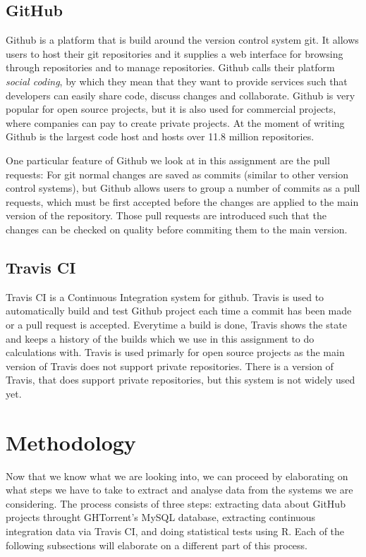 \documentclass[a4paper,11pt]{article}
\begin{document}
		\subsection{GitHub}
			Github \cite{github} is a platform that is build around the version control system git.
			It allows users to host their git repositories and it supplies a web interface for browsing through repositories and
			to manage repositories.
			Github calls their platform \emph{social coding}, by which they mean that they want to provide services such that
			developers can easily share code, discuss changes and collaborate.
			Github is very popular for open source projects, but it is also used for commercial projects, where companies can pay
			to create private projects.
			At the moment of writing Github is the largest code host and hosts over 11.8 million repositories.
			
			One particular feature of Github we look at in this assignment are the pull requests: 
			For git normal changes are saved as commits (similar to other version control systems),
			but Github allows users to group a number of commits as a pull requests, which must be first accepted before the
			changes are applied to the main version of the repository.
			Those pull requests are introduced such that the changes can be checked on quality before commiting them to the main
			version.
		
		\subsection{Travis CI}
		  Travis CI \cite{travis} is a Continuous Integration system for github.
		  Travis is used to automatically build and test Github project each time a commit has been made or a pull request
		  is accepted.
		  Everytime a build is done, Travis shows the state and keeps a history of the builds which we use in this assignment
		  to do calculations with.
		  Travis is used primarly for open source projects as the main version of Travis does not support private
		  repositories.
		  There is a version of Travis, that does support private repositories, but this system is not widely used yet.
		  
		  
		
	\section{Methodology}
		Now that we know what we are looking into, we can proceed by elaborating on what steps we have to take to extract and analyse data from the systems we are considering. The process consists of three steps: extracting data about GitHub projects throught GHTorrent's MySQL database, extracting continuous integration data via Travis CI, and doing statistical tests using R. Each of the following subsections will elaborate on a different part of this process.
		
\end{document}
